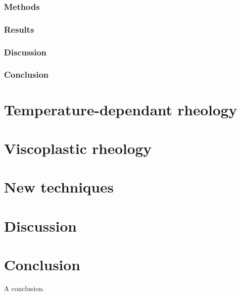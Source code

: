 \documentclass[a4paper,11pt,oneside]{book}
\renewcommand{\section}[1]{\chapter{#1}}
\begin{document}
\subsection{Methods}

\subsection{Results}

\subsection{Discussion}

\subsection{Conclusion}

\section{Temperature-dependant rheology}

\section{Viscoplastic rheology}

\section{New techniques}

\section{Discussion}

\section{Conclusion}

A conclusion.


\end{document}
